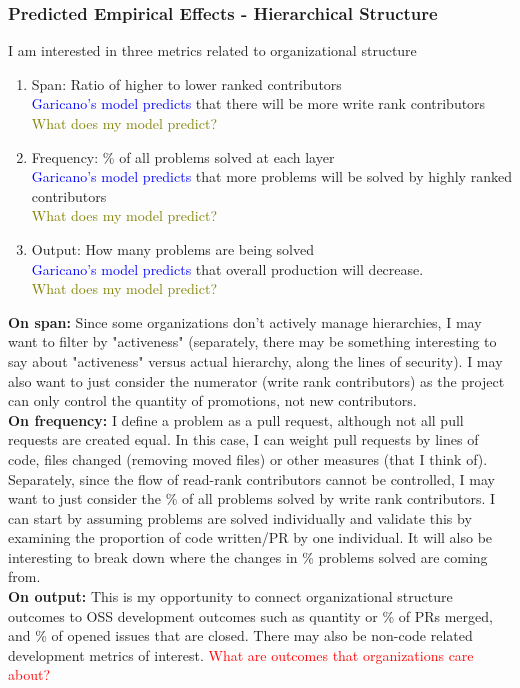 \documentclass[source/paper/main.tex]{subfiles}
\begin{document}
\subsubsection{Predicted Empirical Effects - Hierarchical Structure}
I am interested in three metrics related to organizational structure
\begin{enumerate}
    \item Span: Ratio of higher to lower ranked contributors \\
    \textcolor{blue}{Garicano's model predicts} that there will be more write rank contributors\\
    \textcolor{olive}{What does my model predict?}
    \item Frequency: \% of all problems solved at each layer\\
    \textcolor{blue}{Garicano's model predicts} that more problems will be solved by highly ranked contributors \\
    \textcolor{olive}{What does my model predict?}
    \item Output: How many problems are being solved\\
    \textcolor{blue}{Garicano's model predicts} that overall production will decrease. \\
    \textcolor{olive}{What does my model predict?}
\end{enumerate}
\textbf{On span:} Since some organizations don't actively manage hierarchies, I may want to filter by "activeness" (separately, there may be something interesting to say about "activeness" versus actual hierarchy, along the lines of security). I may also want to just consider the numerator (write rank contributors) as the project can only control the quantity of promotions, not new contributors. \\
\textbf{On frequency: } I define a problem as a pull request, although not all pull requests are created equal. In this case, I can weight pull requests by lines of code, files changed (removing moved files) or other measures (that I think of). Separately, since the flow of read-rank contributors cannot be controlled, I may want to just consider the \% of all problems solved by write rank contributors. I can start by assuming problems are solved individually and validate this by examining the proportion of code written/PR by one individual. It will also be interesting to break down where the changes in \% problems solved are coming from. \\
\textbf{On output: } This is my opportunity to connect organizational structure outcomes to OSS development outcomes such as quantity or \% of PRs merged, and \% of opened issues that are closed. There may also be non-code related development metrics of interest. 
\textcolor{red}{What are outcomes that organizations care about?}
\end{document}
